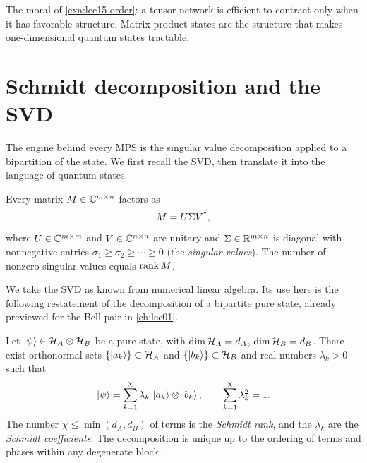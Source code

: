 The moral of \cref{exa:lec15-order}: a tensor network is efficient to contract
only when it has favorable structure. Matrix product states are the structure
that makes one-dimensional quantum states tractable.

\section{Schmidt decomposition and the SVD}
\label{sec:lec15-2}

The engine behind every MPS is the singular value decomposition applied to a
bipartition of the state. We first recall the SVD, then translate it into the
language of quantum states.

\begin{theorem}\label{thm:lec15-svd}
Every matrix $M\in\mathbb{C}^{m\times n}$ factors as
\[
  M=U\Sigma V^{\dagger},
\]
where $U\in\mathbb{C}^{m\times m}$ and $V\in\mathbb{C}^{n\times n}$ are unitary and
$\Sigma\in\mathbb{R}^{m\times n}$ is diagonal with nonnegative entries
$\sigma_1\ge\sigma_2\ge\cdots\ge0$ (the \emph{singular values}). The number of
nonzero singular values equals $\operatorname{rank} M$.
\end{theorem}

We take the SVD as known from numerical linear algebra. Its use here is the
following restatement of the decomposition of a bipartite pure state, already
previewed for the Bell pair in \cref{ch:lec01}.

\begin{theorem}\label{thm:lec15-schmidt}
Let $\ket{\psi}\in\mathcal{H}_A\otimes\mathcal{H}_B$ be a pure state, with
$\dim\mathcal{H}_A=d_A$, $\dim\mathcal{H}_B=d_B$. There exist orthonormal sets
$\{\ket{a_k}\}\subset\mathcal{H}_A$ and $\{\ket{b_k}\}\subset\mathcal{H}_B$ and real numbers
$\lambda_k>0$ such that
\begin{equation}\label{eq:lec15-schmidt}
  \ket{\psi}=\sum_{k=1}^{\chi}\lambda_k\,\ket{a_k}\otimes\ket{b_k},
  \qquad \sum_{k=1}^{\chi}\lambda_k^{2}=1 .
\end{equation}
The number $\chi\le\min(d_A,d_B)$ of terms is the \emph{Schmidt rank}, and the
$\lambda_k$ are the \emph{Schmidt coefficients}. The decomposition is unique up
to the ordering of terms and phases within any degenerate block.
\end{theorem}


